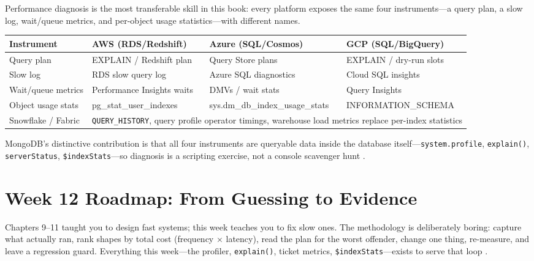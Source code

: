 \begin{crosscloud}
Performance diagnosis is the most transferable skill in this book: every platform exposes the same four instruments---a query plan, a slow log, wait/queue metrics, and per-object usage statistics---with different names.

\vspace{2mm}
{\footnotesize
\begin{tabular}{@{}p{2.9cm}p{3.0cm}p{3.0cm}p{3.0cm}@{}} 
\toprule
\textbf{Instrument} & \textbf{AWS (RDS/Redshift)} & \textbf{Azure (SQL/Cosmos)} & \textbf{GCP (SQL/BigQuery)} \\
\midrule
Query plan & EXPLAIN / Redshift plan & Query Store plans & EXPLAIN / dry-run slots \\
Slow log & RDS slow query log & Azure SQL diagnostics & Cloud SQL insights \\
Wait/queue metrics & Performance Insights waits & DMVs / wait stats & Query Insights \\
Object usage stats & pg\_stat\_user\_indexes & sys.dm\_db\_index\_usage\_stats & INFORMATION\_SCHEMA \\
\addlinespace
Snowflake / Fabric & \multicolumn{3}{l}{\texttt{QUERY\_HISTORY}, query profile operator timings, warehouse load metrics replace per-index statistics} \\
\bottomrule
\end{tabular}}

\vspace{1mm}
MongoDB's distinctive contribution is that all four instruments are queryable data inside the database itself---\texttt{system.profile}, \texttt{explain()}, \texttt{serverStatus}, \texttt{\$indexStats}---so diagnosis is a scripting exercise, not a console scavenger hunt \cite{mongodbProfilerDocs,mongodbExplainDocs}.
\end{crosscloud}

\section{Week 12 Roadmap: From Guessing to Evidence}
Chapters 9--11 taught you to design fast systems; this week teaches you to fix slow ones. The methodology is deliberately boring: capture what actually ran, rank shapes by total cost (frequency $\times$ latency), read the plan for the worst offender, change one thing, re-measure, and leave a regression guard. Everything this week---the profiler, \texttt{explain()}, ticket metrics, \texttt{\$indexStats}---exists to serve that loop \cite{mongodbProfilerDocs}.


